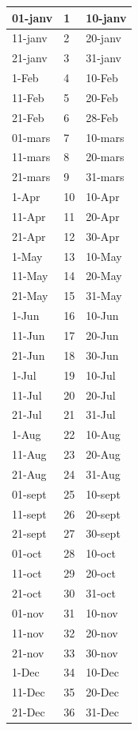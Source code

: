 \documentclass[letterpaper,10pt,english]{sphinxmanual}
\begin{document}
\begin{longtable}{|l|l|l|}
01-janv
 & 
1
 & 
10-janv
\\
\hline
11-janv
 & 
2
 & 
20-janv
\\
\hline
21-janv
 & 
3
 & 
31-janv
\\
\hline
1-Feb
 & 
4
 & 
10-Feb
\\
\hline
11-Feb
 & 
5
 & 
20-Feb
\\
\hline
21-Feb
 & 
6
 & 
28-Feb
\\
\hline
01-mars
 & 
7
 & 
10-mars
\\
\hline
11-mars
 & 
8
 & 
20-mars
\\
\hline
21-mars
 & 
9
 & 
31-mars
\\
\hline
1-Apr
 & 
10
 & 
10-Apr
\\
\hline
11-Apr
 & 
11
 & 
20-Apr
\\
\hline
21-Apr
 & 
12
 & 
30-Apr
\\
\hline
1-May
 & 
13
 & 
10-May
\\
\hline
11-May
 & 
14
 & 
20-May
\\
\hline
21-May
 & 
15
 & 
31-May
\\
\hline
1-Jun
 & 
16
 & 
10-Jun
\\
\hline
11-Jun
 & 
17
 & 
20-Jun
\\
\hline
21-Jun
 & 
18
 & 
30-Jun
\\
\hline
1-Jul
 & 
19
 & 
10-Jul
\\
\hline
11-Jul
 & 
20
 & 
20-Jul
\\
\hline
21-Jul
 & 
21
 & 
31-Jul
\\
\hline
1-Aug
 & 
22
 & 
10-Aug
\\
\hline
11-Aug
 & 
23
 & 
20-Aug
\\
\hline
21-Aug
 & 
24
 & 
31-Aug
\\
\hline
01-sept
 & 
25
 & 
10-sept
\\
\hline
11-sept
 & 
26
 & 
20-sept
\\
\hline
21-sept
 & 
27
 & 
30-sept
\\
\hline
01-oct
 & 
28
 & 
10-oct
\\
\hline
11-oct
 & 
29
 & 
20-oct
\\
\hline
21-oct
 & 
30
 & 
31-oct
\\
\hline
01-nov
 & 
31
 & 
10-nov
\\
\hline
11-nov
 & 
32
 & 
20-nov
\\
\hline
21-nov
 & 
33
 & 
30-nov
\\
\hline
1-Dec
 & 
34
 & 
10-Dec
\\
\hline
11-Dec
 & 
35
 & 
20-Dec
\\
\hline
21-Dec
 & 
36
 & 
31-Dec
\\
\hline\end{longtable}
\end{document}
